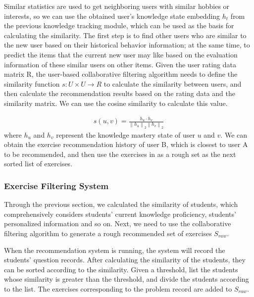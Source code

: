 Similar statistics are used to get neighboring users with similar hobbies or interests, so we can use the obtained user's knowledge state embedding $h_t$ from the previous knowledge tracking module, which can be used as the basis for calculating the similarity. The first step is to find other users who are similar to the new user based on their historical behavior information; at the same time, to predict the items that the current new user may like based on the evaluation information of these similar users on other items. Given the user rating data matrix R, the user-based collaborative filtering algorithm needs to define the similarity function $s : U \times U \to R$ to calculate the similarity between users, and then calculate the recommendation results based on the rating data and the similarity matrix. We can use the cosine similarity to calculate this value.

\begin{align}
  s(u, v)=\frac{h_{u} \cdot h_{v}}{\left\|h_{u}\right\|_{2}\left\|h_{v}\right\|_{2}}
\end{align}
where $h_u$ and $h_v$ represent the knowledge mastery state of user $u$ and $v$.
We can obtain the exercise recommendation history  of user B, which is closest to user A to be recommended, and then use the exercises in  as a rough set as the next sorted list of exercises.

\subsubsection{Exercise Filtering System}
Through the previous section, we calculated the similarity of students, which comprehensively considers students’ current knowledge proficiency, students’ personalized information and so on. Next, we need to use the collaborative filtering algorithm to generate a rough recommended set of exercises $S_{raw}$.

When the recommendation system is running, the system will record the students’ question records. After calculating the similarity of the students, they can be sorted according to the similarity. Given a threshold, list the students whose similarity is greater than the threshold, and divide the students according to the list. The exercises corresponding to the problem record are added to $S_{raw}$.

